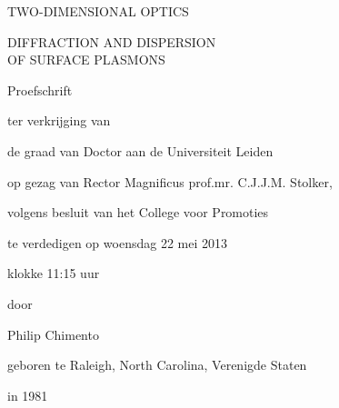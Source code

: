 \clearpage\thispagestyle{empty}
\begin{fullwidth}
\begin{center}
	\Large
	{\par\sffamily\fontsize{28}{32}\selectfont\par
	TWO-DIMENSIONAL OPTICS}

	{\par\sffamily\fontsize{18}{22}\selectfont\par
	DIFFRACTION AND DISPERSION\\ OF SURFACE PLASMONS}

	\vfill
	Proefschrift

	\vspace{2\baselineskip}
	ter verkrijging van

	de graad van Doctor aan de Universiteit Leiden

	op gezag van Rector Magnificus prof.mr. C.J.J.M. Stolker,

	volgens besluit van het College voor Promoties

	te verdedigen op woensdag 22 mei 2013

	klokke 11:15 uur

	\vspace{2\baselineskip}
	door

	\vspace{\baselineskip}
	Philip Chimento

	geboren te Raleigh, North Carolina, Verenigde Staten

	in 1981
\end{center}
\end{fullwidth}


